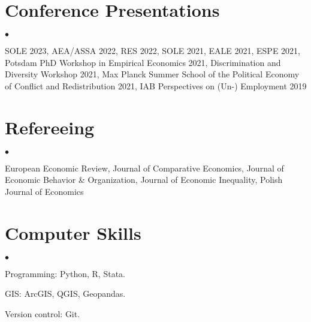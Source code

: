 \documentclass[margin,line]{res}
\newenvironment{list2}{
  \begin{list}{$\bullet$}{%
      \setlength{\itemsep}{0in}
      \setlength{\parsep}{0in} \setlength{\parskip}{0in}
      \setlength{\topsep}{0in} \setlength{\partopsep}{0in} 
      \setlength{\leftmargin}{0.2in}}}{\end{list}}
\begin{document}
\begin{resume}
\section{\sc Conference Presentations} 
\begin{list2}
	\item SOLE 2023, AEA/ASSA 2022, RES 2022, SOLE 2021, EALE 2021, ESPE 2021, Potsdam PhD Workshop in Empirical Economics 2021, Discrimination and Diversity Workshop 2021, Max Planck Summer School of the Political Economy of Conflict and Redistribution 2021, IAB Perspectives on (Un-) Employment 2019 
\end{list2}
\vspace*{.05in} 
\section{\sc Refereeing} 
\begin{list2}
	\item European Economic Review, Journal of Comparative Economics, Journal of Economic Behavior \& Organization, Journal of Economic Inequality, Polish Journal of Economics  
\end{list2}
\vspace*{.05in} 
\section{\sc Computer Skills} 
\begin{list2}
\item Programming: Python, R, Stata.
\item GIS:  ArcGIS, QGIS, Geopandas.
\item Version control: Git.\\ 
\end{list2}



\end{resume}
\end{document}
